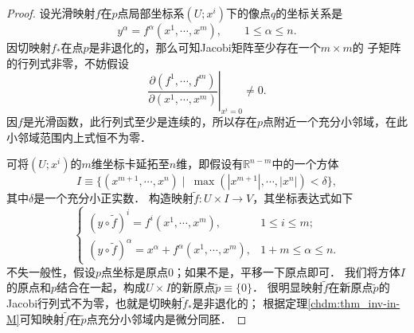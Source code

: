 \begin{proof}
    设光滑映射$f$在$p$点局部坐标系$(U;x^i)$下的像点$q$的坐标关系是
    \begin{equation*}
        y^\alpha = f^\alpha(x^1,\cdots,x^m), \qquad 1 \leqslant \alpha \leqslant n .
    \end{equation*}
    因切映射$f_{*}$在点$p$是非退化的，那么可知Jacobi矩阵至少存在一个$m\times m$的
    子矩阵的行列式非零，不妨假设
    \begin{equation*}
      \left. \frac{\partial ({f^1,\cdots,f^m})}{\partial ({x^1,\cdots,x^m})} \right|_{x^i=0} \neq 0.
    \end{equation*}
    因$f$是光滑函数，此行列式至少是连续的，所以存在$p$点附近一个充分小邻域，在此小邻域范围内上式恒不为零．
    
    可将$(U;x^i)$的$m$维坐标卡延拓至$n$维，即假设有$\mathbb{R}^{n-m}$中的一个方体
    \begin{equation*}
        I\equiv \{(x^{m+1},\cdots,x^n) \mid \ \max(|x^{m+1}|,\cdots,|x^n|) < \delta \} ,
    \end{equation*}
    其中$\delta$是一个充分小正实数．
    构造映射$\tilde{f}:U\times I \to V$，其坐标表达式如下
    \begin{equation}\label{chdm:eqn_tmp88}
        \begin{cases}
            (y\circ \tilde{f})^i = f^i(x^1,\cdots,x^m), & 1 \leqslant i \leqslant m; \\
            (y\circ \tilde{f})^\alpha =x^\alpha+ f^\alpha(x^1,\cdots,x^m), & 1+m \leqslant \alpha \leqslant n .
        \end{cases}
    \end{equation}
    不失一般性，假设$p$点坐标是原点$0$；如果不是，平移一下原点即可．
    我们将方体$I$的原点和$p$结合在一起，构成$U\times I $的新原点$\tilde{p}\equiv\{0\}$．
    很明显映射$\tilde{f}$在新原点$\tilde{p}$的Jacobi行列式不为零，也就是切映射$\tilde{f}_{*}$是非退化的；
    根据定理\ref{chdm:thm_inv-in-M}可知映射$\tilde{f}$在$\tilde{p}$点充分小邻域内是微分同胚．
    

\end{proof}
